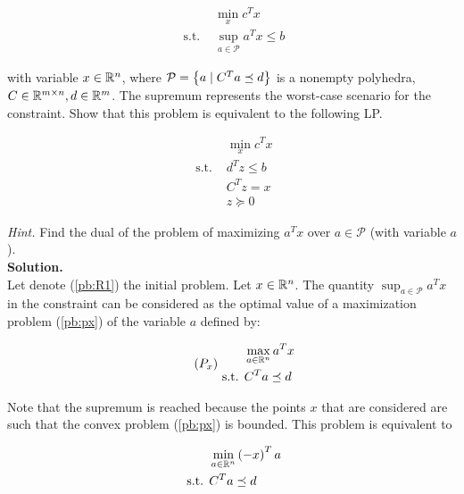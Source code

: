 \documentclass[a4paper, 11pt]{report}
\begin{document}
\begin{equation*}
\tag{R1}
    \begin{aligned}
    & \min_{x} c^{T} x \\
    \text{ s.t. } & \sup_{a \in \mathcal{P}} a^{T} x \leq b
    \end{aligned}
\label{pb:R1}
\end{equation*}

\noindent with variable $x \in \mathbb{R}^{n}$, where $\mathcal{P} = \left\{ a \mid C^{T}a \preceq d\right\}$ is a nonempty polyhedra, $C \in \mathbb{R}^{m \times n}, d \in \mathbb{R}^{m}$. The supremum represents the worst-case scenario for the constraint. Show that this problem is equivalent to the following LP.

\begin{equation*}
\tag{R2}
    \begin{aligned}
    & \min_{x} c^{T} x \\
    \text{ s.t. } & d^{T}z \leq b \\
    & C^{T}z = x \\
    & z \succeq 0
    \end{aligned}
\label{pb:R2}
\end{equation*}

\noindent \textit{Hint.} Find the dual of the problem of maximizing $a^{T}x$ over $a \in \mathcal{P}$ (with variable $a$). \\

\noindent \textbf{Solution.} \\

\noindent Let denote (\ref{pb:R1}) the initial problem. Let $x \in \mathbb{R}^{n}$. The quantity $\sup_{a \in \mathcal{P}} a^{T} x$ in the constraint can be considered as the optimal value of a maximization problem (\ref{pb:px}) of the variable $a$ defined by:

\begin{equation}
\tag{$P_{x}$}
    \begin{aligned}
    & \max_{a \in \Rn} a^{T} x \\
    \text{ s.t. } & C^{T} a \preceq d
    \end{aligned}
\label{pb:px}
\end{equation}

\noindent Note that the supremum is reached because the points $x$ that are considered are such that the convex problem (\ref{pb:px}) is bounded. This problem is equivalent to

\begin{equation*}
    \begin{aligned}
    & \min_{a \in \mathbb{R}^{n}} \left( -x \right)^{T} a \\
    \text{ s.t. } & C^{T} a \preceq d
    \end{aligned}
\end{equation*}
\end{document}
